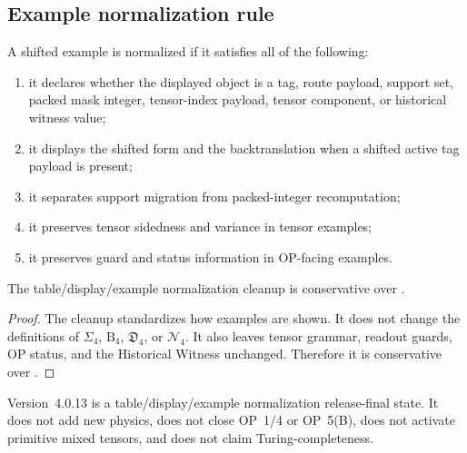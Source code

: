 \subsection{Example normalization rule}
\label{subsec:v404-example-normalization-rule}

\begin{definition}
\label{def:v404-example-normalization-rule}
A shifted example is normalized if it satisfies all of the following:
\begin{enumerate}[leftmargin=*]
 \item it declares whether the displayed object is a tag, route payload,
 support set, packed mask integer, tensor-index payload, tensor component, or
 historical witness value;
 \item it displays the shifted form and the backtranslation when a shifted active
 tag payload is present;
 \item it separates support migration from packed-integer recomputation;
 \item it preserves tensor sidedness and variance in tensor examples;
 \item it preserves guard and status information in OP-facing examples.
\end{enumerate}
\end{definition}

\begin{theorem}
\label{thm:v404-example-normalization-conservativity}
The  table/display/example normalization cleanup is conservative over
.
\end{theorem}

\begin{proof}
The cleanup standardizes how examples are shown. It does not change the
definitions of $\Sigma_4$, $\mathrm B_4$, $\mathfrak D_4$, or
$\mathcal N_4$. It also leaves tensor grammar, readout guards, OP status, and
the Historical Witness unchanged. Therefore it is conservative over .
\end{proof}

\begin{remark}
\label{rem:v404-non-claim}
Version~4.0.13 is a table/display/example normalization release-final state. It does not
add new physics, does not close OP~1/4 or OP~5(B), does not activate primitive
mixed tensors, and does not claim Turing-completeness.
\end{remark}



